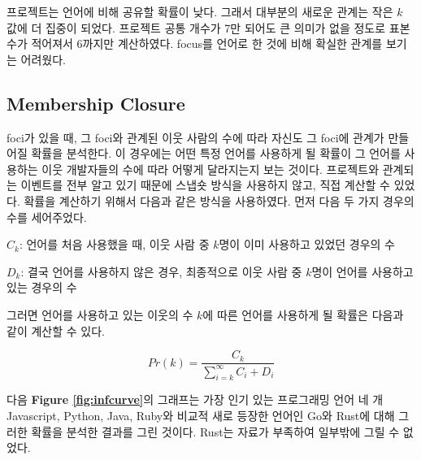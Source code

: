 \documentclass[10pt, a4paper, titlepage]{article}
\begin{document}
프로젝트는 언어에 비해 공유할 확률이 낮다. 그래서 대부분의 새로운 관계는 작은 $k$ 값에 더 집중이 되었다. 프로젝트 공통 개수가 7만 되어도 큰 의미가 없을 정도로 표본 수가 적어져서 6까지만 계산하였다. focus를 언어로 한 것에 비해 확실한 관계를 보기는 어려웠다.



\subsection{Membership Closure}


foci가 있을 때, 그 foci와 관계된 이웃 사람의 수에 따라 자신도 그 foci에 관계가 만들어질 확률을 분석한다. 이 경우에는 어떤 특정 언어를 사용하게 될 확률이 그 언어를 사용하는 이웃 개발자들의 수에 따라 어떻게 달라지는지 보는 것이다.
프로젝트와 관계되는 이벤트를 전부 알고 있기 때문에 스냅숏 방식을 사용하지 않고, 직접 계산할 수 있었다. 확률을 계산하기 위해서 다음과 같은 방식을 사용하였다. 먼저 다음 두 가지 경우의 수를 세어주었다.



$C_k$: 언어를 처음 사용했을 때, 이웃 사람 중 $k$명이 이미 사용하고 있었던 경우의 수

$D_k$: 결국 언어를 사용하지 않은 경우, 최종적으로 이웃 사람 중 $k$명이 언어를 사용하고 있는 경우의 수

그러면 언어를 사용하고 있는 이웃의 수 $k$에 따른 언어를 사용하게 될 확률은 다음과 같이 계산할 수 있다.


$$
Pr(k) = \frac{C_k}{\sum_{i=k}^{\infty}{C_i + D_i} }
$$

다음 {\bf Figure \ref{fig:infcurve}}의 그래프는 가장 인기 있는 프로그래밍 언어 네 개 Javascript, Python, Java, Ruby와 비교적 새로 등장한 언어인 Go와 Rust에 대해 그러한 확률을 분석한 결과를 그린 것이다. Rust는 자료가 부족하여 일부밖에 그릴 수 없었다.
\end{document}
